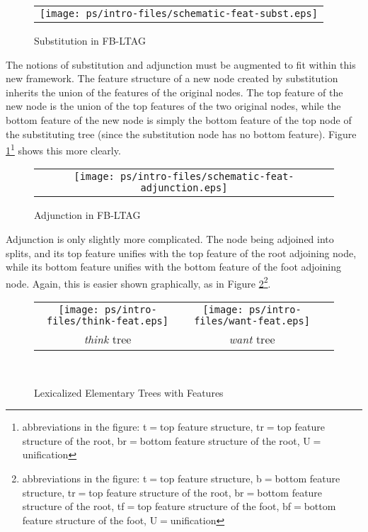 \begin{figure}[htb]
\centering
\begin{tabular}{c}
\texttt{[image: ps/intro-files/schematic-feat-subst.eps]}
\end{tabular}
\caption{Substitution in FB-LTAG}
\label{subst-fig}
\end{figure}

The notions of substitution and adjunction must be augmented to fit
within this new framework.  The feature structure of a new node created
by substitution inherits the union of the features of the original
nodes.  The top feature of the new node is the union of the top
features of the two original nodes, while the bottom feature of the new
node is simply the bottom feature of the top node of the substituting
tree (since the substitution node has no bottom feature).  Figure
\ref{subst-fig}\footnote{abbreviations in the figure:  t$=$top feature
structure, tr$=$top feature structure of the root, br$=$bottom feature
structure of the root, U$=$unification} shows this more clearly.

\begin{figure}[htb]
\centering
\begin{tabular}{c}
\hspace{0.65in}
\texttt{[image: ps/intro-files/schematic-feat-adjunction.eps]}
\end{tabular}
\caption{Adjunction in FB-LTAG}
\label{adjunct-fig}
\end{figure}

Adjunction is only slightly more complicated.  The node being adjoined into
splits, and its top feature unifies with the top feature of the root
adjoining node, while its bottom feature unifies with the bottom feature of the
foot adjoining node.  Again, this is easier shown graphically, as in Figure
\ref{adjunct-fig}\footnote{abbreviations in the figure: t$=$top
feature structure, b$=$bottom feature structure, tr$=$top feature
structure of the root, br$=$bottom feature structure of the root,
tf$=$top feature structure of the foot, bf$=$bottom feature structure
of the foot, U$=$unification}.

\begin{figure}[htbp]
\centering
\begin{tabular}{ccc}
\texttt{[image: ps/intro-files/think-feat.eps]}  &
\hspace{0.6in}
\texttt{[image: ps/intro-files/want-feat.eps]} \\
{\it think} tree&{\it want} tree\\
\end{tabular}\\
\caption {Lexicalized Elementary Trees with Features}
\label {lex-with-features}
\label{2;Tnx0Vs1}
\end{figure}


